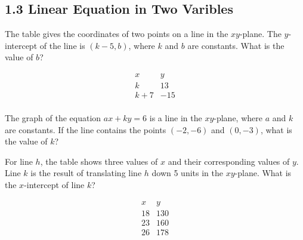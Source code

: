 \subsection*{1.3 Linear Equation in Two Varibles}

\vspace{0.5em}

\setcounter{questionnum}{0}

\noindent\markforreview

\vspace{1em}

The table gives the coordinates of two points on a line in the $xy$-plane. The $y$-intercept of the line is $(k - 5, b)$, where $k$ and $b$ are constants. What is the value of $b$?

\[
\begin{array}{c|c}
x & y \\
\hline
k & 13 \\
k + 7 & -15 \\
\end{array}
\]

\vspace{0.75em}


\vspace{2em}

\noindent\markforreview

\vspace{1em}

The graph of the equation $ax + ky = 6$ is a line in the $xy$-plane, where $a$ and $k$ are constants. If the line contains the points $(-2, -6)$ and $(0, -3)$, what is the value of $k$?

\vspace{0.75em}


\newpage
\noindent\markforreview

\vspace{1em}

For line $h$, the table shows three values of $x$ and their corresponding values of $y$. Line $k$ is the result of translating line $h$ down 5 units in the $xy$-plane. What is the $x$-intercept of line $k$?

\[
\begin{array}{c|c}
x & y \\
\hline
18 & 130 \\
23 & 160 \\
26 & 178 \\
\end{array}
\]

